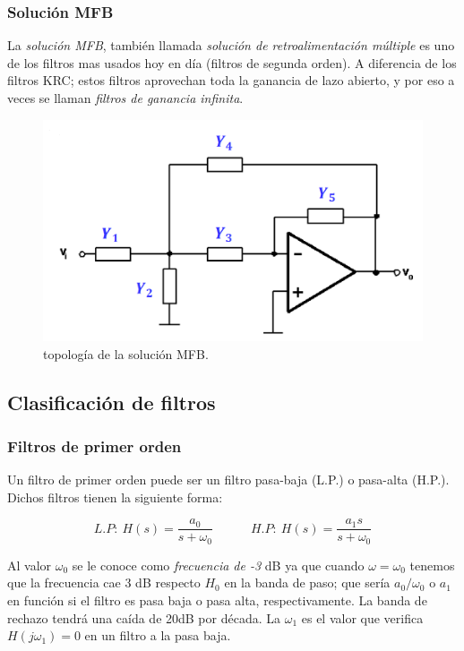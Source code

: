 \documentclass[11pt]{article} %
\newcommand{\tquad}{\quad \quad \quad}
\begin{document}
\subsubsection{Solución MFB}

La \textit{solución MFB}, también llamada \textit{solución de retroalimentación múltiple} es uno de los filtros mas usados hoy en día (filtros de segunda orden). A diferencia de los filtros KRC; estos filtros aprovechan toda la ganancia de lazo abierto, y por eso a veces se llaman \textit{filtros de ganancia infinita}. 

\begin{figure}[h!] \centering
\includegraphics[scale=0.45]{2.4-MFB}
\caption{topología de la solución MFB.}
\label{Fig:2.20}
\end{figure}

\subsection{Clasificación de filtros}
\subsubsection{Filtros de primer orden}

Un filtro de primer orden puede ser un filtro pasa-baja (L.P.) o pasa-alta (H.P.). Dichos filtros tienen la siguiente forma:

\begin{equation}
L.P:  \ H(s) = \dfrac{a_0}{s+\omega_0} \tquad  
H.P:  \ H(s) = \dfrac{a_1 s}{s+\omega_0} 
\end{equation}

Al valor $\omega_0$ se le conoce como \textit{frecuencia de -3} dB ya que cuando $\omega=\omega_0$ tenemos que la frecuencia cae 3 dB respecto $H_0$ en la banda de paso; que sería $a_0/\omega_0$ o $a_1$ en función si el filtro es pasa baja o pasa alta, respectivamente. La banda de rechazo tendrá una caída de 20dB por década. La $\omega_1$ es el valor que verifica $H(j\omega_1)=0$ en un filtro a la pasa baja.
\end{document}
